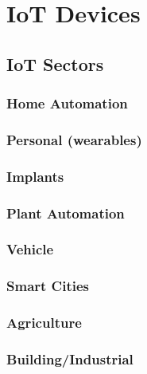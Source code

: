 \hypertarget{iot-devices}{%
\section{IoT Devices}\label{iot-devices}}

\hypertarget{iot-sectors}{%
\subsection{IoT Sectors}\label{iot-sectors}}

\hypertarget{home-automation}{%
\subsubsection{Home Automation}\label{home-automation}}

\hypertarget{personal-wearables}{%
\subsubsection{Personal (wearables)}\label{personal-wearables}}

\hypertarget{implants}{%
\subsubsection{Implants}\label{implants}}

\hypertarget{plant-automation}{%
\subsubsection{Plant Automation}\label{plant-automation}}

\hypertarget{vehicle}{%
\subsubsection{Vehicle}\label{vehicle}}

\hypertarget{smart-cities}{%
\subsubsection{Smart Cities}\label{smart-cities}}

\hypertarget{agriculture}{%
\subsubsection{Agriculture}\label{agriculture}}

\hypertarget{buildingindustrial}{%
\subsubsection{Building/Industrial}\label{buildingindustrial}}


